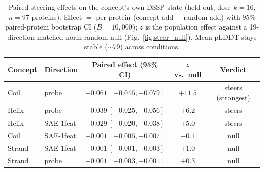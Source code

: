 \begin{table}[H]\centering
  \caption{Paired steering effects on the concept's own DSSP state (held-out,
  dose $k{=}16$, $n{=}97$ proteins). Effect $=$ per-protein
  (concept-add $-$ random-add) with 95\% paired-protein bootstrap CI
  ($B{=}10{,}000$); $z$ is the population effect against a 19-direction
  matched-norm random null (Fig.~\ref{fig:steer_null}). Mean pLDDT stays stable
  ($\sim$79) across conditions.}
  \label{tab:steering}
  \small
  \begin{tabular}{llccc}
    \toprule
    Concept & Direction & Paired effect (95\% CI) & $z$ vs.\ null & Verdict \\
    \midrule
    Coil   & probe     & $+0.061\ [+0.045,+0.079]$ & $+11.5$ & steers (strongest) \\
    Helix  & probe     & $+0.039\ [+0.025,+0.056]$ & $+6.2$ & steers \\
    Helix  & SAE-1feat & $+0.029\ [+0.020,+0.038]$ & $+5.0$ & steers \\
    Coil   & SAE-1feat & $+0.001\ [-0.005,+0.007]$ & $-0.1$ & null \\
    Strand & SAE-1feat & $+0.001\ [-0.001,+0.003]$ & $+1.0$ & null \\
    Strand & probe     & $-0.001\ [-0.003,+0.001]$ & $+0.3$ & null \\
    \bottomrule
  \end{tabular}
\end{table}
